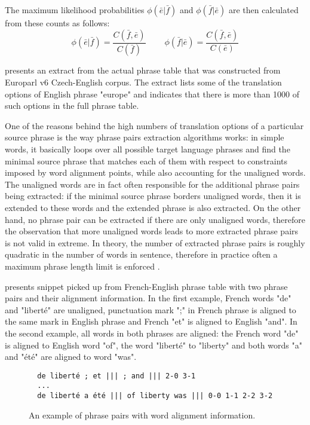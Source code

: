 The maximum likelihood probabilities $\phi(\bar{e}|\bar{f})$ and
$\phi(\bar{f}|\bar{e})$ are then calculated from these counts as follows:
\begin{equation}
  \phi(\bar{e}|\bar{f}) = \frac{C(\bar{f},\bar{e})}{C(\bar{f})}
  ~~~~~~~~~~ %
  \phi(\bar{f}|\bar{e}) = \frac{C(\bar{f},\bar{e})}{C(\bar{e})}
\end{equation}

 presents an extract from the actual phrase table
that was constructed from Europarl v6 Czech-English corpus.
The extract lists some of the translation options of English phrase "europe" and
indicates that there is more than 1000 of such options in the full phrase table.

One of the reasons behind the high numbers of translation options of a particular
source phrase is the way phrase pairs extraction algorithms works:
in simple words, it basically loops over all possible target language phrases
and find the minimal source phrase that matches each of them with respect to
constraints imposed by word alignment points, while also accounting for
the unaligned words.
The unaligned words are in fact often responsible for the additional phrase pairs
being extracted: if the minimal source phrase borders unaligned words,
then it is extended to these words and the extended phrase is also extracted.
On the other hand, no phrase pair can be extracted if there are only unaligned
words, therefore the observation that more unaligned words leads to more
extracted phrase pairs is not valid in extreme.
In theory, the number of extracted phrase pairs is roughly quadratic in the number
of words in sentence, therefore in practice often a maximum phrase length limit
is enforced \citep[Chapter 5.2]{koehn:smt}.

 presents snippet picked up from French-English
phrase table with two phrase pairs and their alignment information.
In the first example, French words "de" and "liberté" are unaligned,
punctuation mark ";" in French phrase is aligned to the same mark in English phrase
and French "et" is aligned to English "and".
In the second example, all words in both phrases are aligned:
the French word "de" is aligned to English word "of", the word "liberté" to "liberty"
and both words "a" and "été" are aligned to word "was".

\begin{figure}[ht]
\begin{verbatim}
  de liberté ; et ||| ; and ||| 2-0 3-1
  ...
  de liberté a été ||| of liberty was ||| 0-0 1-1 2-2 3-2
\end{verbatim}
\caption{\label{fig:phrase-pair-alignment}
An example of phrase pairs with word alignment information.}
\end{figure}

